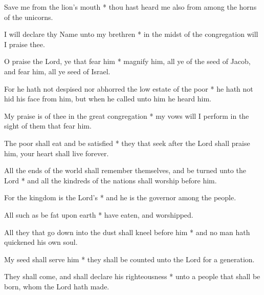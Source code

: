 Save me from the lion's mouth * thou hast heard me also from among the horns of the unicorns.

I will declare thy Name unto my brethren * in the midst of the congregation will I praise thee.

O praise the Lord, ye that fear him * magnify him, all ye of the seed of Jacob, and fear him, all ye seed of Israel.

For he hath not despised nor abhorred the low estate of the poor * he hath not hid his face from him, but when he called unto him he heard him.

My praise is of thee in the great congregation * my vows will I perform in the sight of them that fear him.

The poor shall eat and be satisfied * they that seek after the Lord shall praise him, your heart shall live forever.

All the ends of the world shall remember themselves, and be turned unto the Lord * and all the kindreds of the nations shall worship before him.

For the kingdom is the Lord's * and he is the governor among the people.

All such as be fat upon earth * have eaten, and worshipped.

All they that go down into the dust shall kneel before him * and no man hath quickened his own soul.

My seed shall serve him * they shall be counted unto the Lord for a generation.

They shall come, and shall declare his righteousness * unto a people that shall be born, whom the Lord hath made.
